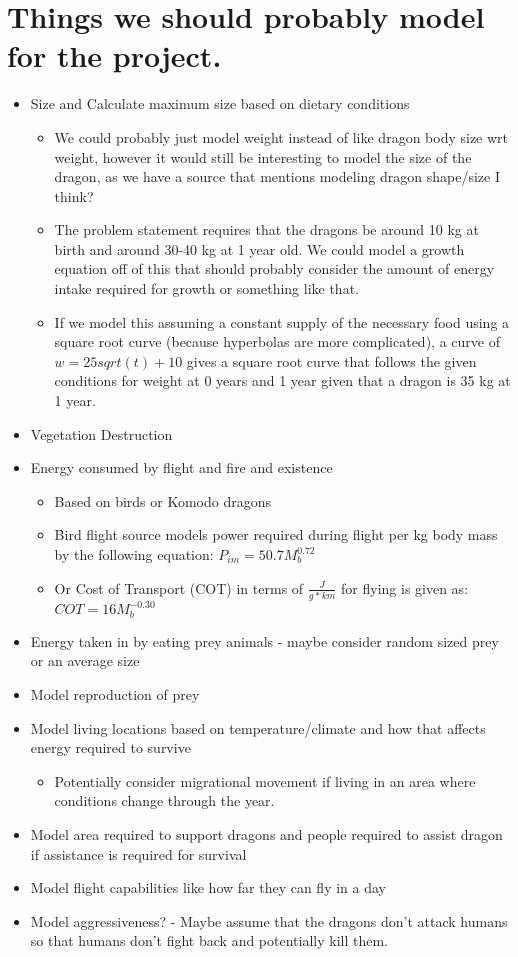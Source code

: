 \documentclass{article}
\begin{document}
\section{Things we should probably model for the project.}
\begin{itemize}
\item Size and Calculate maximum size based on dietary 
conditions
\begin{itemize}
    \item We could probably just model weight instead of like dragon body size wrt weight, however it would still be interesting to model the size of the dragon, as we have a source that mentions modeling dragon shape/size I think? 
    \item The problem statement requires that the dragons be around 10 kg at birth and around 30-40 kg at 1 year old. We could model a growth equation off of this that should probably consider the amount of energy intake required for growth or something like that. 
    \item If we model this assuming a constant supply of the necessary food using a square root curve (because hyperbolas are more complicated), a curve of $w=25sqrt(t)+10$ gives a square root curve that follows the given conditions for weight at 0 years and 1 year given that a dragon is 35 kg at 1 year.
\end{itemize} 
\item Vegetation Destruction
\item Energy consumed by flight and fire and existence
\begin{itemize}
    \item Based on birds or Komodo dragons
    \item Bird flight source models power required during flight per kg body mass by the following equation: $P_{im}=50.7M^{0.72}_b$
    \item Or Cost of Transport (COT) in terms of $\frac{J}{g*km}$ for flying is given as: $COT=16M_b^{-0.30}$
\end{itemize}
\item Energy taken in by eating prey animals - maybe consider random sized prey or an average size
\item Model reproduction of prey
\item Model living locations based on temperature/climate and how that affects energy required to survive
\begin{itemize}
    \item Potentially consider migrational movement if living in an area where conditions change through the year. 
\end{itemize} 
\item Model area required to support dragons and people required to assist dragon if assistance is required for survival
\item Model flight capabilities like how far they can fly in a day
\item Model aggressiveness? - Maybe assume that the dragons don't attack humans so that humans don't fight back and potentially kill them. 
\end{itemize}
 
\end{document}
